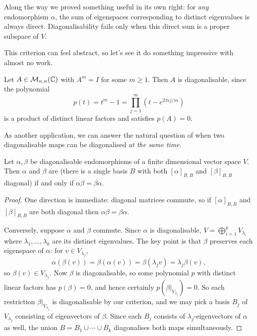 \documentclass[a4paper]{scrartcl}
\begin{document}
\begin{remark}
    Along the way we proved something useful in its own right: for \emph{any} endomorphism $\alpha$, the sum of eigenspaces corresponding to distinct eigenvalues is always direct. Diagonalisability fails only when this direct sum is a proper subspace of $V$.
\end{remark}

This criterion can feel abstract, so let's see it do something impressive with almost no work.

\begin{example}
    Let $A \in \mathcal{M}_{n,n}(\mathbb{C})$ with $A^m = I$ for some $m \geq 1$. Then $A$ is diagonalisable, since the polynomial
    $$
    p(t) = t^m - 1 = \prod_{j = 1}^{m} (t - e^{2\pi i j / m})
    $$
    is a product of distinct linear factors and satisfies $p(A) = 0$.
\end{example}

As another application, we can answer the natural question of when two diagonalisable maps can be diagonalised \emph{at the same time}.

\begin{theorem}
    Let $\alpha, \beta$ be diagonalisable endomorphisms of a finite dimensional vector space $V$. Then $\alpha$ and $\beta$ are  (there is a single basis $B$ with both $[\alpha]_{B,B}$ and $[\beta]_{B,B}$ diagonal) if and only if $\alpha\beta = \beta\alpha$.
\end{theorem}
\begin{proof}
    One direction is immediate: diagonal matrices commute, so if $[\alpha]_{B,B}$ and $[\beta]_{B,B}$ are both diagonal then $\alpha\beta = \beta\alpha$.

    Conversely, suppose $\alpha$ and $\beta$ commute. Since $\alpha$ is diagonalisable, $V = \bigoplus_{i = 1}^k V_{\lambda_i}$ where $\lambda_1, \dots, \lambda_k$ are its distinct eigenvalues. The key point is that $\beta$ preserves each eigenspace of $\alpha$: for $v \in V_{\lambda_j}$,
    $$
    \alpha(\beta(v)) = \beta(\alpha(v)) = \beta(\lambda_j v) = \lambda_j \beta(v),
    $$
    so $\beta(v) \in V_{\lambda_j}$. Now $\beta$ is diagonalisable, so some polynomial $p$ with distinct linear factors has $p(\beta) = 0$, and hence certainly $p(\beta|_{V_{\lambda_j}}) = 0$. So each restriction $\beta|_{V_{\lambda_j}}$ is diagonalisable by our criterion, and we may pick a basis $B_j$ of $V_{\lambda_j}$ consisting of eigenvectors of $\beta$. Since each $B_j$ consists of $\lambda_j$-eigenvectors of $\alpha$ as well, the union $B = B_1 \cup \cdots \cup B_k$ diagonalises both maps simultaneously.
\end{proof}
\end{document}
